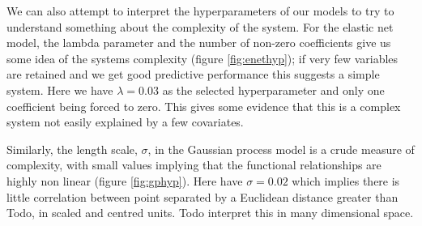 \documentclass[10pt,]{article}
\begin{document}




We can also attempt to interpret the hyperparameters of our models to try to understand something about the complexity of the system. For the elastic net model, the lambda parameter and the number of non-zero coefficients give us some idea of the systems complexity (figure \ref{fig:enethyp}); if very few variables are retained and we get good predictive performance this suggests a simple system. Here we have \(\lambda = 0.03\) as the selected hyperparameter and only one coefficient being forced to zero. This gives some evidence that this is a complex system not easily explained by a few covariates.

Similarly, the length scale, \(\sigma\), in the Gaussian process model is a crude measure of complexity, with small values implying that the functional relationships are highly non linear (figure \ref{fig:gphyp}). Here have \(\sigma = 0.02\) which implies there is little correlation between point separated by a Euclidean distance greater than Todo, in scaled and centred units. Todo interpret this in many dimensional space.
\end{document}
